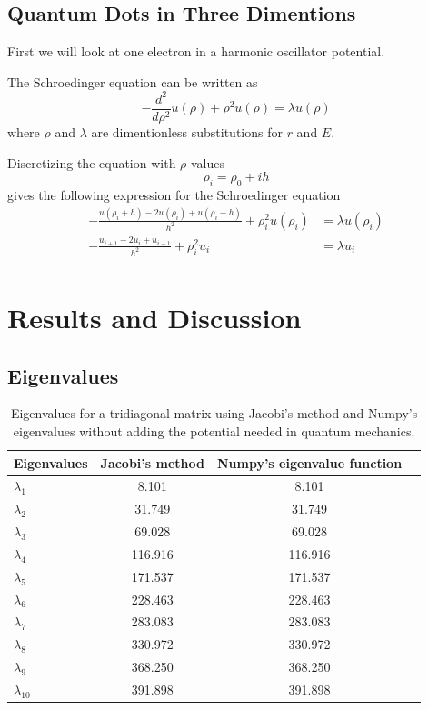 \documentclass{article}
\begin{document}
\subsection{Quantum Dots in Three Dimentions}


First we will look at one electron in a harmonic oscillator potential.

The Schroedinger equation can be written as
$$-\frac{d^2}{d\rho^2}u(\rho)+\rho^2u(\rho)=\lambda u(\rho)$$
where $\rho$ and $\lambda$ are dimentionless substitutions for $r$ and $E$.

Discretizing the equation with $\rho$ values
$$\rho_i=\rho_0+ih$$
gives the following expression for the Schroedinger equation
\begin{equation*}
\begin{split}
-\frac{u(\rho_i+h)-2u(\rho_i)+u(\rho_i-h)}{h^2}+\rho_i^2u(\rho_i)&=\lambda u(\rho_i)\\
-\frac{u_{i+1}-2u_i+u_{i-1}}{h^2}+\rho_i^2u_i&=\lambda u_i\\
\end{split}
\end{equation*}

\section{Results and Discussion}

\subsection{Eigenvalues}

\begin{table}[H]
    \centering
    \begin{tabular}{|l|c|c|r|}
    \hline
     Eigenvalues & Jacobi's method & Numpy's eigenvalue function\\
     \hline
      $\lambda_1$  & 8.101  & 8.101 \\
      $\lambda_2$  & 31.749  & 31.749 \\
      $\lambda_3$  & 69.028  & 69.028 \\
      $\lambda_4$  & 116.916  & 116.916 \\
      $\lambda_5$  & 171.537 & 171.537 \\
      $\lambda_6$  & 228.463  & 228.463 \\
      $\lambda_7$  & 283.083  & 283.083 \\
      $\lambda_8$  & 330.972 & 330.972 \\
      $\lambda_9$  & 368.250 & 368.250 \\
      $\lambda_{10}$ & 391.898 & 391.898 \\
      \hline
    \end{tabular}
    \caption{Eigenvalues for a tridiagonal matrix using Jacobi's method and Numpy's eigenvalues without adding the potential needed in quantum mechanics.}
    \label{eigenvalues}
\end{table}
\end{document}
